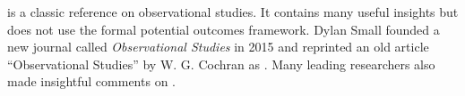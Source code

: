 \begin{HomeworkProblem}\label{exr:10-6}


\citet{cochran1965planning} is a classic reference on observational studies. It contains many useful insights but does not use the formal potential outcomes framework.
Dylan Small founded a new journal called {\it Observational Studies} in 2015 \citep{small2015introduction} and reprinted an old article ``Observational Studies'' by W. G. Cochran as  \citet{cochran2015}.  Many leading researchers also made insightful comments on  \citet{cochran2015}.


\end{HomeworkProblem}
